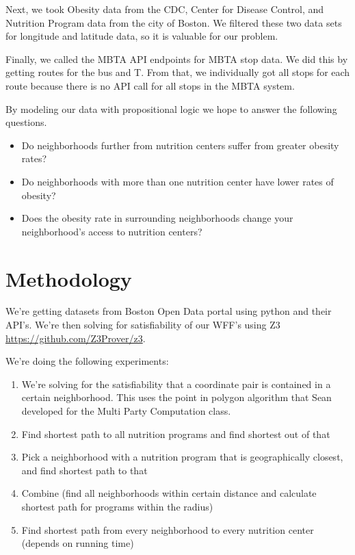 \documentclass[12pt]{article}
\begin{document}
Next, we took Obesity data from the CDC, Center for Disease Control, and Nutrition Program data from the city of Boston. We filtered these two data sets for longitude and latitude data, so it is valuable for our problem.

Finally, we called the MBTA API endpoints for MBTA stop data. We did this by getting routes for the bus and T. From that, we individually got all stops for each route because there is no API call for all stops in the MBTA system. 

 By modeling our data with propositional logic we hope to answer the following questions. 
 
 \begin{itemize}
 \item Do neighborhoods further from nutrition centers suffer from greater obesity rates?
 \item Do neighborhoods with more than one nutrition center have lower rates of obesity?
 \item Does the obesity rate in surrounding neighborhoods change your neighborhood's access to nutrition centers?
 \end{itemize}

 \section{Methodology}

We're getting datasets from Boston Open Data portal using python and their API's. We're then solving for satisfiability of our WFF's using Z3 \url{https://github.com/Z3Prover/z3}.

We're doing the following experiments:

\begin{enumerate}
\item We're solving for the satisfiability that a coordinate pair is contained in a certain neighborhood. This uses the point in polygon algorithm that Sean developed for the Multi Party Computation class.
\item Find shortest path to all nutrition programs and find shortest out of that
\item Pick a neighborhood with a nutrition program that is geographically closest, and find shortest path to that
\item Combine (find all neighborhoods within certain distance and calculate shortest path for programs within the radius)
\item Find shortest path from every neighborhood to every nutrition center (depends on running time)
\end{enumerate}
\end{document}
